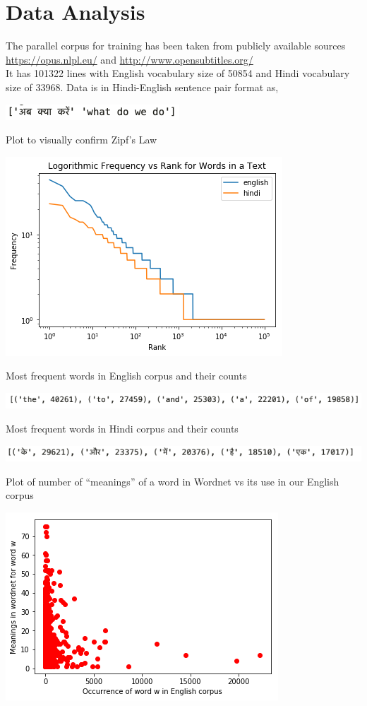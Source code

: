\documentclass[11pt, oneside]{article}   	%
\begin{document}
\section{Data Analysis}
The parallel corpus for training has been taken from publicly available sources \url{https://opus.nlpl.eu/} and \url{http://www.opensubtitles.org/ }\\
It has 101322 lines with English vocabulary size of 50854 and Hindi vocabulary size of 33968. Data is in Hindi-English sentence pair format as,
\begin{center}
\includegraphics[scale=0.58]{eg.png} 
\end{center}
\newpage
Plot to visually confirm Zipf's Law
\begin{center}
\includegraphics[scale=0.6]{zipf.png}
\end{center}
Most frequent words in English corpus and their counts
\begin{center}
\includegraphics[scale=0.6]{eng.png} 
\end{center}
Most frequent words in Hindi corpus and their counts
\begin{center}
\includegraphics[scale=0.6]{hinfreq.png} 
\end{center}
Plot of number of “meanings” of a word in Wordnet vs its use in our English corpus
\begin{center}
\includegraphics[scale=0.6]{meaning.png}
\end{center}
\end{document}
